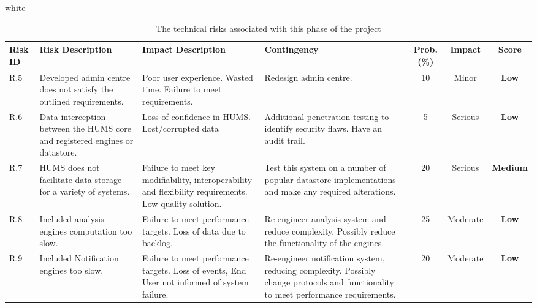 \documentclass[10pt,a4paper]{article}
\newcommand{\tableformat}[4]{
\begin{table}[H]
\centering
  \rowcolors{2}{gray!10} {white}
\begin{tabular}{#1}
  \hline
  \rowcolor[gray]{0.9} #2
\end{tabular}
\caption{#3}
\label{#4}
\end{table}}
\begin{document}
\tableformat{p{0.8cm} p{3cm} p{3cm} p{3cm} c c c}
{ 	\hline
    Risk ID & Risk Description & Impact Description & Contingency & Prob.(\%) & Impact & Score \\
  	\hline
  
    R.5 & Developed admin centre does not satisfy the outlined requirements. & Poor user experience. Wasted time. Failure to meet requirements. & Redesign admin centre. & 10 & Minor & \textbf{Low} \\
    R.6 & Data interception between the HUMS core and registered engines or datastore. & Loss of confidence in HUMS. Lost/corrupted data & Additional penetration testing to identify security flaws. Have an audit trail. & 5 & Serious &  \textbf{Low} \\
    R.7 & HUMS does not facilitate data storage for a variety of systems. & Failure to meet key modifiability, interoperability and flexibility requirements. Low quality solution. &  Test this system on a number of popular datastore implementations and make any required alterations. & 20 & Serious & \textbf{Medium} \\
    R.8 & Included analysis engines computation too slow. & Failure to meet performance targets. Loss of data due to backlog. & Re-engineer analysis system and reduce complexity. Possibly reduce the functionality of the engines. & 25 & Moderate & \textbf{Low} \\	
    R.9 & Included Notification engines too slow. & Failure to meet performance targets. Loss of events, End User not informed of system failure. & Re-engineer notification system, reducing complexity. Possibly change protocols and functionality to meet performance requirements. & 20 & Moderate & \textbf{Low} \\	
  	\hline
}
{The technical risks associated with this phase of the project}{tab:tech_risks}
\end{document}
